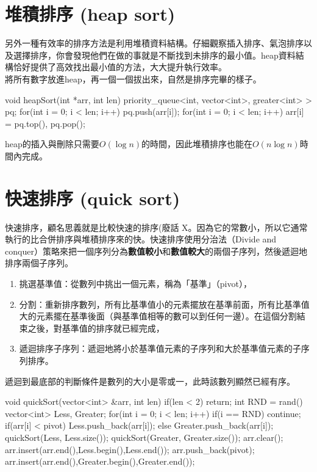 \section{堆積排序 (heap sort)}
另外一種有效率的排序方法是利用堆積資料結構。仔細觀察插入排序、氣泡排序以及選擇排序，你會發現他們在做的事就是不斷找到未排序的最小值。heap資料結構恰好提供了高效找出最小值的方法，大大提升執行效率。\\
\indent 將所有數字放進heap，再一個一個拔出來，自然是排序完畢的樣子。
\begin{C++}
void heapSort(int *arr, int len){
    priority_queue<int, vector<int>, greater<int> > pq;
    for(int i = 0; i < len; i++)
        pq.push(arr[i]);
    for(int i = 0; i < len; i++)
        arr[i] = pq.top(), pq.pop();
}
\end{C++}
heap的插入與刪除只需要$O(\log n)$的時間，因此堆積排序也能在$O(n\log n)$時間內完成。
\section{快速排序 (quick sort)}
快速排序，顧名思義就是比較快速的排序(廢話 X。因為它的常數小，所以它通常執行的比合併排序與堆積排序來的快。快速排序使用分治法（Divide and conquer）策略來把一個序列分為\textbf{數值較小}和\textbf{數值較大}的兩個子序列，然後遞迴地排序兩個子序列。\\
\begin{enumerate}
\item 挑選基準值：從數列中挑出一個元素，稱為「基準」（pivot），
\item 分割：重新排序數列，所有比基準值小的元素擺放在基準前面，所有比基準值大的元素擺在基準後面（與基準值相等的數可以到任何一邊）。在這個分割結束之後，對基準值的排序就已經完成，
\item 遞迴排序子序列：遞迴地將小於基準值元素的子序列和大於基準值元素的子序列排序。
\end{enumerate}
遞迴到最底部的判斷條件是數列的大小是零或一，此時該數列顯然已經有序。
\begin{C++}
void quickSort(vector<int> &arr, int len){
    if(len < 2) return;
    int RND = rand()%
    vector<int> Less, Greater;
    for(int i = 0; i < len; i++){
        if(i == RND) continue;
        if(arr[i] < pivot)
            Less.push_back(arr[i]);
        else Greater.push_back(arr[i]);
    }
    quickSort(Less, Less.size());
    quickSort(Greater, Greater.size());
    arr.clear();
    arr.insert(arr.end(),Less.begin(),Less.end());
    arr.push_back(pivot);
    arr.insert(arr.end(),Greater.begin(),Greater.end());
}
\end{C++}
